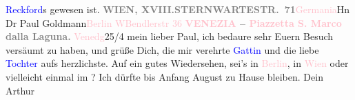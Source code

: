 {                                    \textcolor{blue}{Reckford}s gewesen
                                 ist. }\toendnotes[C]{\smallbreak}\pstart{}{\pb}\label{T_L02404-1v}\label{T_L02404-1h}\pend{}\pstart{}\textcolor{pink}{\textcolor{gray}{\textbf{WIEN, XVIII.}}}{}\ledrightnote{\textcolor{pink}{XVIII., Währing}}\pend{}\pstart{}\textcolor{pink}{\textcolor{gray}{\textbf{STERNWARTESTR. 71}}}{}\ledrightnote{\textcolor{pink}{Sternwartestraße}}\pend{}{\bigskip}\pstart{}{\pb}\textcolor{pink}{Germania}{}\ledrightnote{\textcolor{pink}{Deutschland}}\pend{}\pstart{}Hn Dr Paul Goldmann\pend{}\pstart{}\textcolor{pink}{Berlin W}{}\ledrightnote{\textcolor{pink}{Berlin}}\pend{}\pstart{}\textcolor{pink}{Bendlerstr 36}{}\ledrightnote{\textcolor{pink}{Stauffenbergstraße}}\pend{}{\bigskip}\pstart
           \noindent{}\centering{}{\pb}\textcolor{gray}{\textbf{\textcolor{pink}{VENEZIA}{}\ledrightnote{\textcolor{pink}{Venedig}} – \textcolor{pink}{Piazzetta S. Marco}{}\ledrightnote{\textcolor{pink}{San Marco}} dalla
                     Laguna.}}\pend
           \pstart
           \raggedleft{}{\pb}\textcolor{pink}{Venedg}{}\ledrightnote{\textcolor{pink}{Venedig}}{ }25/4\pend
           \pstart
           mein lieber Paul, ich bedaure sehr Euern Besuch versäumt zu haben,
               und grüße Dich, die mir verehrte \textcolor{blue}{Gattin}{} und die liebe \textcolor{blue}{Tochter}{} aufs herzlichste.\pend
           \pstart
           Auf ein gutes Wiedersehen, sei’s in \textcolor{pink}{Berlin}{}\ledrightnote{\textcolor{pink}{Berlin}}, in
                  \textcolor{pink}{Wien}{}\ledrightnote{\textcolor{pink}{Wien}} oder vielleicht einmal im \label{K_L02687-1v}\label{K_L02687-1h}?\pend
           \pstart
           Ich dürfte bis Anfang August zu Hause bleiben.\pend
           \pstart Dein \spacefill\mbox{Arthur}\pend{}\endnumbering{}\begin{anhang}\end{anhang}
      